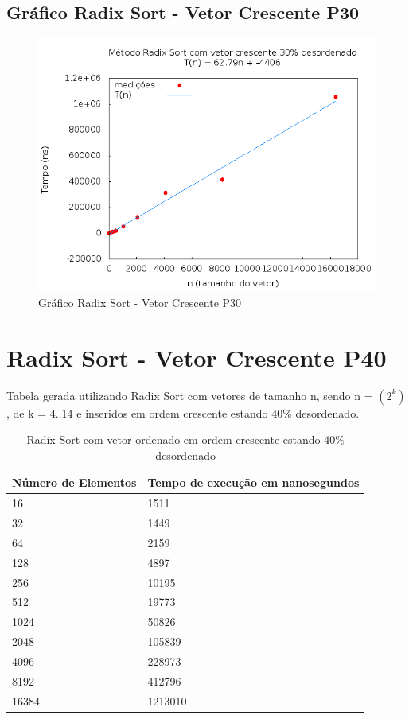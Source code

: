 \documentclass[12pt,a4paper,twoside]{report}
\begin{document}
\subsection{Gráfico Radix Sort - Vetor Crescente P30}
\begin{figure}[H]
    \centering
    \includegraphics[width=0.7\linewidth]{graficos/RadixSort/vIntCrescenteP30/vIntCrescenteP30.png}
  \caption{Gráfico Radix Sort - Vetor Crescente P30}
\end{figure}

\section{Radix Sort - Vetor Crescente P40}
Tabela gerada utilizando Radix Sort com vetores de tamanho n, sendo n = $(2^k)$, de k = 4..14 e inseridos em ordem crescente estando 40\% desordenado.
\begin{table}[H]
\centering
\caption{Radix Sort com vetor ordenado em ordem crescente estando 40\% desordenado}
\label{my-label}
\begin{tabular}{|l|l|}
\hline
\multicolumn{1}{|c|}{\textbf{Número de Elementos}} & \multicolumn{1}{c|}{\textbf{Tempo de execução em nanosegundos}} \\ \hline
16 & 1511 \\ \hline
32 & 1449 \\ \hline
64 & 2159 \\ \hline
128 & 4897 \\ \hline
256 & 10195 \\ \hline
512 & 19773 \\ \hline
1024 & 50826 \\ \hline
2048 & 105839 \\ \hline
4096 & 228973 \\ \hline
8192 & 412796 \\ \hline
16384 & 1213010 \\ \hline
\end{tabular}
\end{table}
\end{document}
